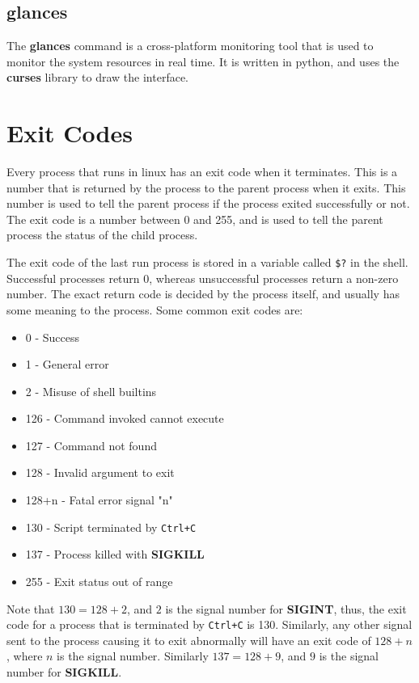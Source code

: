 \subsection{glances}

The \textbf{glances} command is a cross-platform monitoring tool that is
used to monitor the system resources in real time. It is written in python,
and uses the \textbf{curses} library to draw the interface.


\vfill
\pagebreak
\section{Exit Codes}

Every process that runs in linux has an exit code when it terminates.
This is a number that is returned by the process to the parent process
when it exits. This number is used to tell the parent process if the
process exited successfully or not. The exit code is a number between
0 and 255, and is used to tell the parent process the status of the
child process.

The exit code of the last run process is stored in a variable
called \lstinline|$?| in the shell. Successful processes return 0,
whereas unsuccessful processes return a non-zero number.
The exact return code is decided by the process itself, and usually
has some meaning to the process. Some common exit codes are:

\begin{itemize}
  \item 0 - Success
  \item 1 - General error
  \item 2 - Misuse of shell builtins
  \item 126 - Command invoked cannot execute
  \item 127 - Command not found
  \item 128 - Invalid argument to exit
  \item 128+n - Fatal error signal "n"
  \item 130 - Script terminated by \lstinline|Ctrl+C|
  \item 137 - Process killed with \textbf{SIGKILL}
  \item 255 - Exit status out of range
\end{itemize}

\begin{remark}
Note that $130=128+2$, and $2$ is the signal number for \textbf{SIGINT},
thus, the exit code for a process that is terminated by \lstinline|Ctrl+C|
is 130. Similarly, any other signal sent to the process causing it to
exit abnormally will have an exit code of $128+n$, where $n$ is the signal
number. Similarly $137=128+9$, and $9$ is the signal number for \textbf{SIGKILL}.
\end{remark}

